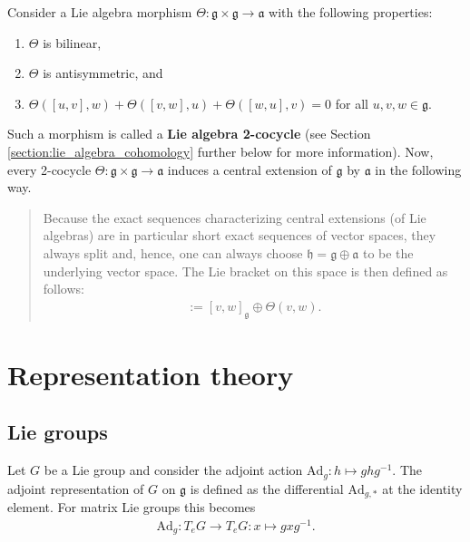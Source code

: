     \begin{construct}\label{lie:cocycle}
        Consider a Lie algebra morphism $\Theta:\mathfrak{g}\times\mathfrak{g}\rightarrow\mathfrak{a}$ with the following properties:
        \begin{enumerate}
            \item $\Theta$ is bilinear,
            \item $\Theta$ is antisymmetric, and
            \item $\Theta([u,v],w) + \Theta([v,w],u) + \Theta([w,u],v) = 0$ for all $u,v,w\in\mathfrak{g}$.
        \end{enumerate}
        Such a morphism is called a \textbf{Lie algebra 2-cocycle} (see Section \ref{section:lie_algebra_cohomology} further below for more information). Now, every 2-cocycle $\Theta:\mathfrak{g}\times\mathfrak{g}\rightarrow\mathfrak{a}$ induces a central extension of $\mathfrak{g}$ by $\mathfrak{a}$ in the following way.
        \begin{quote}
            Because the exact sequences characterizing central extensions (of Lie algebras) are in particular short exact sequences of vector spaces, they always split and, hence, one can always choose $\mathfrak{h}=\mathfrak{g}\oplus\mathfrak{a}$ to be the underlying vector space. The Lie bracket on this space is then defined as follows:
            \begin{gather}
                [v\oplus\lambda,w\oplus\mu] := [v,w]_{\mathfrak{g}}\oplus\Theta(v,w).
            \end{gather}
        \end{quote}
    \end{construct}

\section{Representation theory}
\subsection{Lie groups}


    \begin{example}\label{lie:adjoint_representation}
        Let $G$ be a Lie group and consider the adjoint action $\mathrm{Ad}_g:h\mapsto ghg^{-1}$. The adjoint representation of $G$ on $\mathfrak{g}$ is defined as the differential $\mathrm{Ad}_{g,*}$ at the identity element. For matrix Lie groups this becomes
        \begin{gather}
            \mathrm{Ad}_g:T_eG\rightarrow T_eG:x\mapsto gxg^{-1}.
        \end{gather}
    \end{example}

